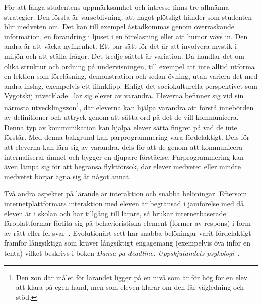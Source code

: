 För att fånga studentens uppmärksamhet och intresse finns tre allmänna
strategier. Den första är varseblivning, att något plötsligt händer som studenten
blir medveten om. Det kan till exempel åstadkommas genom överraskande
information, en förändring i ljuset i en föreläsning eller att humor vävs in.
Den andra är att väcka nyfikenhet. Ett par sätt för det är att involvera mystik
i miljön och att ställa frågor. Det tredje sättet är variation. Då handlar det
om olika struktur och ordning på undervisningen, till exempel att inte alltid
utforma en lektion som föreläsning, demonstration och sedan övning, utan variera
det med andra inslag, exempelvis ett filmklipp.
Enligt det sociokulturella perspektivet som Vygotskij utvecklade~\cite{LSB_und}
lär sig elever av varandra. Eleverna befinner sig vid sin närmsta
utvecklingszon\footnote{Den zon där målet för lärandet ligger på en nivå som är
för hög för en elev att klara på egen hand, men som eleven klarar om den får
vägledning och stöd.}, där eleverna kan hjälpa varandra att förstå innebörden av
definitioner och uttryck genom att sätta ord på det de vill kommunicera. Denna
typ av kommunikation kan hjälpa elever sätta fingret på vad de
inte förstår. Med denna bakgrund kan parprogrammering vara
fördelaktigt. Dels för att eleverna kan lära sig av varandra, dels för att de genom att
kommunicera
internaliserar ämnet och bygger en djupare
förståelse. Parprogrammering kan även lämpa sig för att begränsa
flyktförsök, där elever medvetet eller mindre medvetet börjar ägna sig åt något annat.


Två andra aspekter på lärande är interaktion och snabba
belöningar. Eftersom internetplattformars interaktion med eleven är
begränsad i jämförelse med då eleven är i skolan och har tillgång till
lärare, så brukar internetbaserade läroplattformar förlita sig på
behavioristiska element (former av respons) i form av rätt eller fel
svar~\cite{LSB_und}. Evolutionärt sett har snabba belöningar varit
fördelaktigt framför långsiktiga som kräver långsiktigt engagemang
(exempelvis öva inför en tenta) vilket beskrivs i boken \textit{Dansa
på deadline: Uppskjutandets psykologi}~\cite{DPD}.

